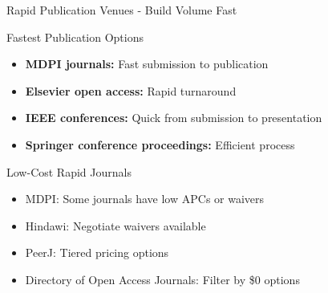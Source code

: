 \documentclass[11pt]{beamer}
\begin{document}
	\begin{frame}{Rapid Publication Venues - Build Volume Fast}
		\scriptsize
		\begin{block}{Fastest Publication Options}
			\begin{itemize}
				\item \textbf{MDPI journals:} Fast submission to publication
				\item \textbf{Elsevier open access:} Rapid turnaround
				\item \textbf{IEEE conferences:} Quick from submission to presentation
				\item \textbf{Springer conference proceedings:} Efficient process
			\end{itemize}
		\end{block}
		\begin{block}{Low-Cost Rapid Journals}
			\begin{itemize}
				\item MDPI: Some journals have low APCs or waivers
				\item Hindawi: Negotiate waivers available
				\item PeerJ: Tiered pricing options
				\item Directory of Open Access Journals: Filter by \$0 options
			\end{itemize}
		\end{block}
	\end{frame}
	
\end{document}
